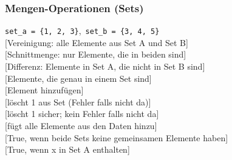 \subsubsection{Mengen-Operationen (Sets)}\label{sec:01-set-operationen}
\begin{contentbox}
\texttt{set\_a = \{1, 2, 3\}},\ \texttt{set\_b = \{3, 4, 5\}}\\
[Vereinigung: alle Elemente aus Set A und Set B]\\
[Schnittmenge: nur Elemente, die in beiden sind]\\
[Differenz: Elemente in Set A, die nicht in Set B sind]\\
[Elemente, die genau in einem Set sind]\\
[Element hinzufügen]\\
[löscht 1 aus Set (Fehler falls nicht da)]\\
[löscht 1 sicher; kein Fehler falls nicht da]\\
[fügt alle Elemente aus den Daten hinzu]\\
[True, wenn beide Sets keine gemeinsamen Elemente haben]\\
[True, wenn x in Set A enthalten]
\end{contentbox}

